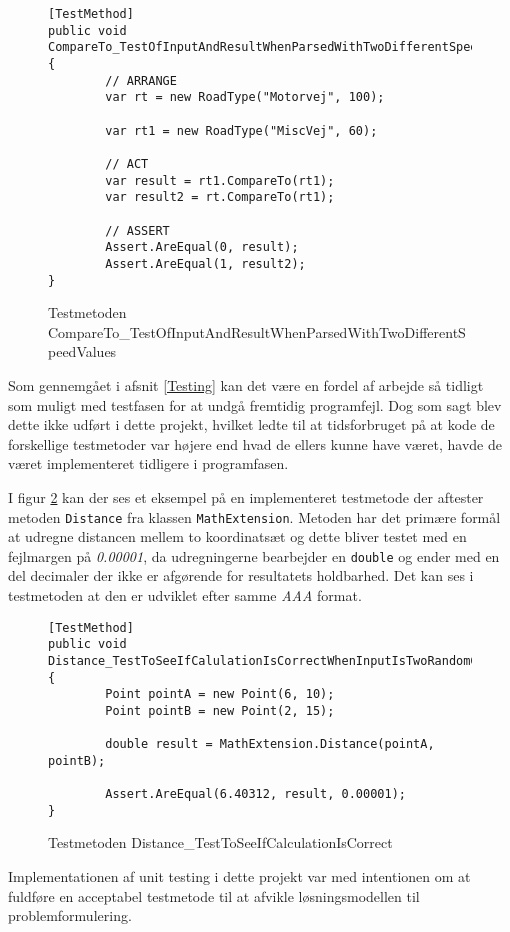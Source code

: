\begin{figure}[H]
\begin{lstlisting}
[TestMethod]
public void CompareTo_TestOfInputAndResultWhenParsedWithTwoDifferentSpeedValues()
{
		// ARRANGE
		var rt = new RoadType("Motorvej", 100);
           
		var rt1 = new RoadType("MiscVej", 60);

		// ACT
		var result = rt1.CompareTo(rt1);
		var result2 = rt.CompareTo(rt1);

		// ASSERT    
		Assert.AreEqual(0, result);
		Assert.AreEqual(1, result2);
}
\end{lstlisting}
\caption{Testmetoden CompareTo\_TestOfInputAndResultWhenParsedWithTwoDifferentSpeedValues}\label{comparetotestmetode}
\end{figure}

Som gennemgået i afsnit \ref{Testing} kan det være en fordel af arbejde så tidligt som muligt med testfasen for at undgå fremtidig programfejl. Dog som sagt blev dette ikke udført i dette projekt, hvilket ledte til at tidsforbruget på at kode de forskellige testmetoder var højere end hvad de ellers kunne have været, havde de været implementeret tidligere i programfasen.

I figur \ref{DistanceTestMethod} kan der ses et eksempel på en implementeret testmetode der aftester metoden \texttt{Distance} fra klassen \texttt{MathExtension}. Metoden har det primære formål at udregne distancen mellem to koordinatsæt og dette bliver testet med en fejlmargen på \textit{0.00001}, da udregningerne bearbejder en \texttt{double} og ender med en del decimaler der ikke er afgørende for resultatets holdbarhed. Det kan ses i testmetoden at den er udviklet efter samme \textit{AAA} format.

\begin{figure}[H]
\begin{lstlisting}
[TestMethod]
public void Distance_TestToSeeIfCalulationIsCorrectWhenInputIsTwoRandomCoords()
{
		Point pointA = new Point(6, 10);
		Point pointB = new Point(2, 15);

        double result = MathExtension.Distance(pointA, pointB);

        Assert.AreEqual(6.40312, result, 0.00001);
}
\end{lstlisting}
\caption{Testmetoden Distance\_TestToSeeIfCalculationIsCorrect}\label{DistanceTestMethod}
\end{figure}

Implementationen af unit testing i dette projekt var med intentionen om at fuldføre en acceptabel testmetode til at afvikle løsningsmodellen til problemformulering.
